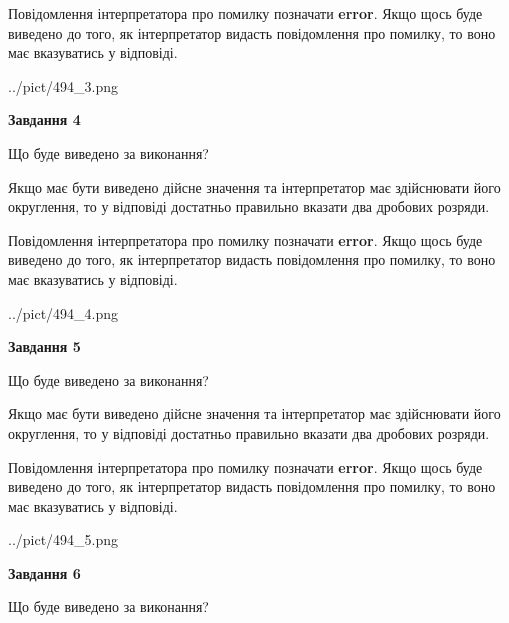 \documentclass[12pt, ukrainian]{article}
\begin{document}
{\begin {Large}
Повідомлення інтерпретатора про помилку позначати \textbf{error}.
Якщо щось буде виведено до того, як інтерпретатор видасть повідомлення про помилку, 
то воно має вказуватись у відповіді. \par

\begin{center}
	{../pict/494_3.png}
\end{center}
\newpage

{\begin {center}\textbf{Завдання 4}\end {center}}\par
Що буде виведено за виконання? \par

Якщо має бути виведено дійсне значення та інтерпретатор має здійснювати його округлення, 
то у відповіді достатньо правильно вказати два дробових розряди.

Повідомлення інтерпретатора про помилку позначати \textbf{error}.
Якщо щось буде виведено до того, як інтерпретатор видасть повідомлення про помилку, 
то воно має вказуватись у відповіді. \par

\begin{center}
	{../pict/494_4.png}
\end{center}
\newpage

{\begin {center}\textbf{Завдання 5}\end {center}}\par
Що буде виведено за виконання? \par

Якщо має бути виведено дійсне значення та інтерпретатор має здійснювати його округлення, 
то у відповіді достатньо правильно вказати два дробових розряди.

Повідомлення інтерпретатора про помилку позначати \textbf{error}.
Якщо щось буде виведено до того, як інтерпретатор видасть повідомлення про помилку, 
то воно має вказуватись у відповіді. \par

\begin{center}
	{../pict/494_5.png}
\end{center}
\newpage

{\begin {center}\textbf{Завдання 6}\end {center}}\par
Що буде виведено за виконання? \par


\end{Large}}
\end{document}
